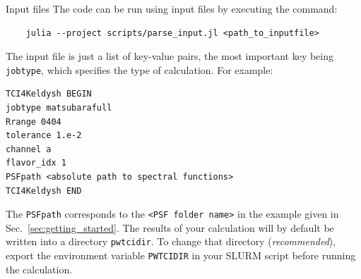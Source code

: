 \documentclass[12pt]{article}
\begin{document}
\begin{section}{Input files}
The code can be run using input files by executing the command:
\begin{verbatim}
    julia --project scripts/parse_input.jl <path_to_inputfile>
\end{verbatim}
The input file is just a list of key-value pairs, the most important key being
\texttt{jobtype}, which specifies the type of calculation. For example:
\begin{verbatim}
TCI4Keldysh BEGIN
jobtype matsubarafull
Rrange 0404
tolerance 1.e-2
channel a
flavor_idx 1
PSFpath <absolute path to spectral functions>
TCI4Keldysh END
\end{verbatim}
The \texttt{PSFpath} corresponds to the \texttt{<PSF folder name>} in the example given in Sec.\ \ref{sec:getting_started}.
The results of your calculation will by default be written into a directory \texttt{pwtcidir}. To change that directory (\textit{recommended}),
export the environment variable \texttt{PWTCIDIR} in your SLURM script before running the calculation.


\end{section}
\end{document}
